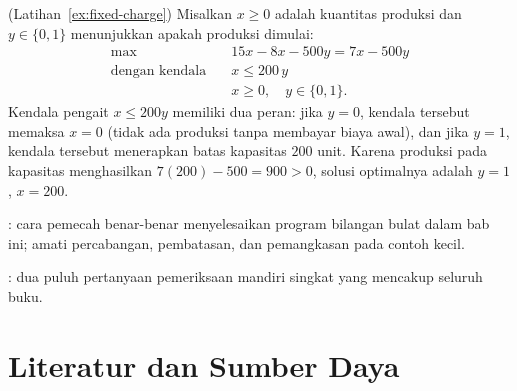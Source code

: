 \begin{solution}(Latihan~\ref{ex:fixed-charge})
Misalkan $x \geq 0$ adalah kuantitas produksi dan $y \in \{0,1\}$ menunjukkan apakah produksi dimulai:
\[
\begin{aligned}
\max\quad & 15x - 8x - 500y = 7x - 500y\\
\text{dengan kendala}\quad & x \leq 200\,y\\
& x \geq 0, \quad y \in \{0,1\}.
\end{aligned}
\]
Kendala pengait $x \leq 200y$ memiliki dua peran: jika $y = 0$, kendala tersebut memaksa $x = 0$ (tidak ada produksi tanpa membayar biaya awal), dan jika $y = 1$, kendala tersebut menerapkan batas kapasitas $200$ unit. Karena produksi pada kapasitas menghasilkan $7(200) - 500 = 900 > 0$, solusi optimalnya adalah $y = 1$, $x = 200$.
\end{solution}

\begin{tryit}
: cara pemecah benar-benar menyelesaikan program bilangan bulat dalam bab ini; amati percabangan, pembatasan, dan pemangkasan pada contoh kecil.

: dua puluh pertanyaan pemeriksaan mandiri singkat yang mencakup seluruh buku.
\end{tryit}

\section{Literatur dan Sumber Daya}


